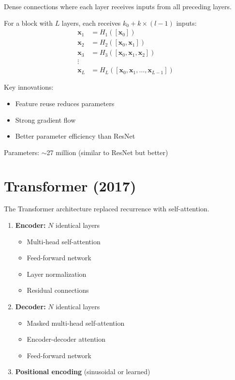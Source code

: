 Dense connections where each layer receives inputs from all preceding layers.

\begin{architecture}
For a block with $L$ layers, each receives $k_0 + k \times (l-1)$ inputs:
\begin{align}
\mathbf{x}_1 &= H_1([\mathbf{x}_0]) \\
\mathbf{x}_2 &= H_2([\mathbf{x}_0, \mathbf{x}_1]) \\
\mathbf{x}_3 &= H_3([\mathbf{x}_0, \mathbf{x}_1, \mathbf{x}_2]) \\
\vdots \\
\mathbf{x}_L &= H_L([\mathbf{x}_0, \mathbf{x}_1, \ldots, \mathbf{x}_{L-1}])
\end{align}
\end{architecture}

Key innovations:
\begin{itemize}
    \item Feature reuse reduces parameters
    \item Strong gradient flow
    \item Better parameter efficiency than ResNet
\end{itemize}

Parameters: $\sim$27 million (similar to ResNet but better)

\section{Transformer (2017)}

The Transformer architecture replaced recurrence with self-attention.

\begin{architecture}
\begin{enumerate}
    \item \textbf{Encoder:} $N$ identical layers
    \begin{itemize}
        \item Multi-head self-attention
        \item Feed-forward network
        \item Layer normalization
        \item Residual connections
    \end{itemize}
    \item \textbf{Decoder:} $N$ identical layers
    \begin{itemize}
        \item Masked multi-head self-attention
        \item Encoder-decoder attention
        \item Feed-forward network
    \end{itemize}
    \item \textbf{Positional encoding} (sinusoidal or learned)
\end{enumerate}
\end{architecture}

